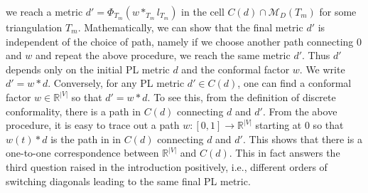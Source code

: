 \documentclass[11pt]{article}
\begin{document}
we reach a metric $d'= \Phi_{T_m}(w *_{T_m} l_{T_m})$ in the cell  $C(d)\cap \mathcal{M}_D(T_m)$ 
for some triangulation $T_m$. Mathematically, we can show that the final metric $d'$ is independent 
of the choice of path, namely if we choose another path connecting $0$ and $w$ and repeat the above
procedure, we reach the same metric $d'$. Thus $d'$ depends only on the initial PL metric $d$ and the 
conformal factor $w$. We write $d'= w*d$.  Conversely, for any PL metric $d'\in C(d)$, one can find a conformal
factor $w\in \mathbb{R}^{|V|}$ so that $d'= w*d$. To see this, from the definition of discrete conformality, 
there is a path in $C(d)$ connecting $d$ and $d'$. From the above procedure, it is easy to trace out 
a path $w: [0, 1] \rightarrow  \mathbb{R}^{|V|}$ starting at $0$ so that $w(t)*d$ is the path 
in  in $C(d)$ connecting $d$ and $d'$. This shows that there is 
a one-to-one correspondence between $\mathbb{R}^{|V|}$ and $C(d)$. This in fact answers the third question 
raised in the introduction positively, i.e., different orders of switching diagonals leading to 
the same final PL metric.
\end{document}
